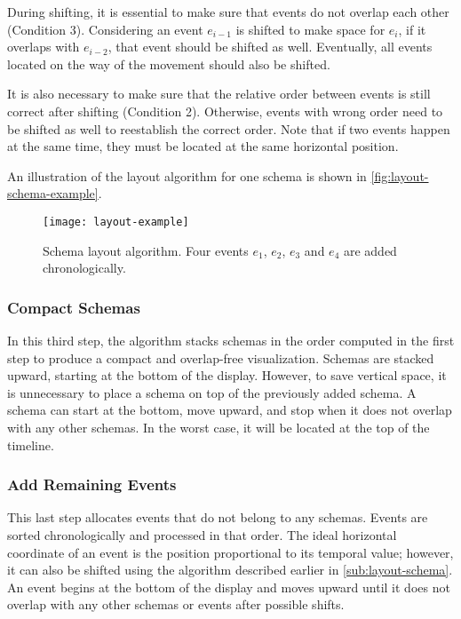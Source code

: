 During shifting, it is essential to make sure that events do not overlap each other (Condition 3). Considering an event $e_{i-1}$ is shifted to make space for $e_i$, if it overlaps with $e_{i-2}$, that event should be shifted as well. Eventually, all events located on the way of the movement should also be shifted.

It is also necessary to make sure that the relative order between events is still correct after shifting (Condition 2). Otherwise, events with wrong order need to be shifted as well to reestablish the correct order. Note that if two events happen at the same time, they must be located at the same horizontal position. 

An illustration of the layout algorithm for one schema is shown in \autoref{fig:layout-schema-example}.

\begin{figure}[!htb]
	\centering
	\texttt{[image: layout-example]}
	\caption{Schema layout algorithm. Four events $e_1$, $e_2$, $e_3$ and $e_4$ are added chronologically.}
	\label{fig:layout-schema-example}
\end{figure}

\subsubsection{Compact Schemas}
In this third step, the algorithm stacks schemas in the order computed in the first step to produce a compact and overlap-free visualization. Schemas are stacked upward, starting at the bottom of the display. However, to save vertical space, it is unnecessary to place a schema on top of the previously added schema. A schema can start at the bottom, move upward, and stop when it does not overlap with any other schemas. In the worst case, it will be located at the top of the timeline.

\subsubsection{Add Remaining Events}
This last step allocates events that do not belong to any schemas. Events are sorted chronologically and processed in that order. The ideal horizontal coordinate of an event is the position proportional to its temporal value; however, it can also be shifted using the algorithm described earlier in \autoref{sub:layout-schema}. An event begins at the bottom of the display and moves upward until it does not overlap with any other schemas or events after possible shifts. 

